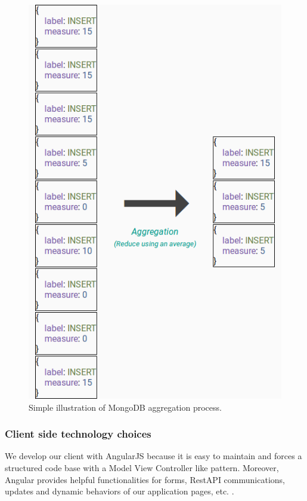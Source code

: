 \documentclass[a4paper,11pt]{report}
\begin{document}
\begin{figure}[ht]
\begin{center}
\includegraphics[scale=0.35]{images/mongodb-agg.png}
\caption{Simple illustration of MongoDB aggregation process.}
\label{mongo_agg}
\end{center}
\end{figure}

\clearpage

\subsubsection{Client side technology choices}

We develop our client with AngularJS because it is easy to maintain and forces a structured code base with a Model View Controller like pattern. Moreover, Angular provides helpful functionalities for forms, RestAPI communications, updates and dynamic behaviors of our application pages, etc. \cite{angular:website}.
\end{document}
